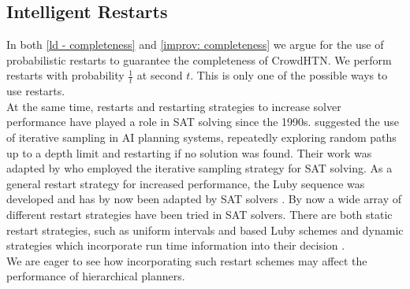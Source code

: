 \subsection{Intelligent Restarts}
In both \ref{ld - completeness} and \ref{improv: completeness} we argue for the use of probabilistic restarts to guarantee the completeness of CrowdHTN. We perform restarts with probability $\frac{1}{t}$ at second $t$. This is only one of the possible ways to use restarts. \\
At the same time, restarts and restarting strategies to increase solver performance have played a role in SAT solving since the 1990s.
\cite{langley1992systematic} suggested the use of iterative sampling in AI planning systems, repeatedly exploring random paths up to a depth limit and restarting if no solution was found. 
Their work was adapted by \cite{crawford1994experimental} who employed the iterative sampling strategy for SAT solving. As a general restart strategy for increased performance, the Luby sequence was developed \cite{luby1993optimal} and has by now been adapted by SAT solvers \cite{huang2007effect}. By now a wide array of different restart strategies have been tried in SAT solvers. There are both static restart strategies, such as uniform intervals and based Luby schemes and dynamic strategies which incorporate run time information into their decision \cite{biere2015evaluating}. \\
We are eager to see how incorporating such restart schemes may affect the performance of hierarchical planners.

\begin{comment}
In SAT solving, restarts have long been an important part of solvers to increase their performance.

- we perform restarts according to the harmonic series
- SAT solving already knows restarts, explore inner-outer and luby sequence for potentially better performance

- \cite{langley1992systematic} suggests iterative sampling as an extreme form of restarts
- \cite{crawford1994experimental} uses restarts via iterative sampling for SAT solving
- \cite{gomes1998boosting} use restarts in planning, argue their use in combinatorial search
- \cite{biere2015evaluating}
- optimal restart points may be unknown
- frequent restarts may help in learning
- long times may be needed to find solutions
- show that luby is quite good
- different restart policies:
- static: uniform, geometric, luby
- dynamic: agility - prohibit restart depending on status, 
- \cite{luby1993optimal} propose the luby sequence as a strategy
- \cite{huang2007effect} use luby sequence in SAT
\end{comment}